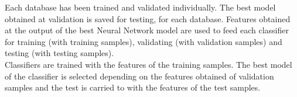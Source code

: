 Each database has been trained and validated individually. The best model obtained at validation is saved for testing, for each database. Features obtained at the output of the best Neural Network model are used to feed each classifier for training (with training samples), validating (with validation samples) and testing (with testing samples).\\

Classifiers are trained with the features of the training samples. The best model of the classifier is selected depending on the features obtained of validation samples and the test is carried to with the features of the test samples.\\






